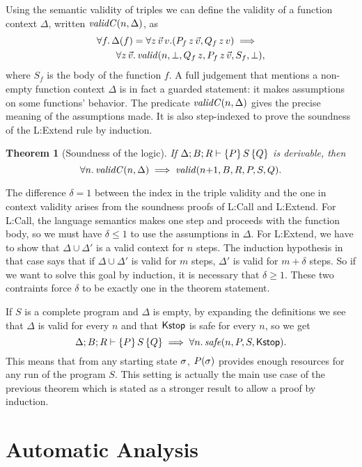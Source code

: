 \documentclass[nocopyrightspace,preprint]{sigplanconf}
\newtheorem{theorem}{Theorem}
\begin{document}
Using the semantic validity of triples we can define the validity
of a function context $\Delta$, written $\mathit{validC}(n,\Delta)$, as
\begin{align*}
  &\forall f .\, \Delta(f) =
    \forall z \, \vec v \, v .(P_f \, z \, \vec v, Q_f \, z \, v)
    \implies \\
  &\qquad \forall z \, \vec v .\,
  \mathit{valid}(n,\bot,Q_f \, z,P_f \, z \, \vec v,S_f,\bot) ,
\end{align*}
where $S_f$ is the body of the function $f$.  A full
judgement that mentions a non-empty function context
$\Delta$ is in fact a guarded statement: it makes
assumptions on some functions' behavior.  The predicate
$\mathit{validC}(n,\Delta)$ gives the precise meaning of the
assumptions made.  It is also step-indexed to prove the
soundness of the {\sc L:Extend} rule by induction.
%
\begin{theorem}[Soundness of the logic]
  If $\Delta; B; R \vdash \{P\}\, S\, \{Q\}$ is derivable, then
  $$
    \forall n .\, \mathit{validC}(n,\Delta)
      \implies \mathit{valid}(n {+} 1,B,R,P,S,Q).
  $$
\end{theorem}
%
\noindent
The difference $\delta = 1$ between the index in the triple
validity and the one in context validity arises from
the soundness proofs of {\sc L:Call} and {\sc L:Extend}.  For
{\sc L:Call}, the language semantics makes one step and
proceeds with the function body, so we must have
$\delta \le 1$ to use the assumptions in $\Delta$.
For {\sc L:Extend}, we have to show that $\Delta \cup \Delta'$
is a valid context for $n$ steps.  The induction hypothesis
in that case says that if $\Delta \cup \Delta'$ is valid
for $m$ steps, $\Delta'$ is valid for $m+\delta$ steps.
So if we want to solve this goal by induction, it is
necessary that $\delta \ge 1$.  These two contraints force
$\delta$ to be exactly one in the theorem statement.

If $S$ is a complete program and $\Delta$ is empty, by
expanding the definitions we see that $\Delta$ is valid
for every $n$ and that $\mathsf{Kstop}$ is safe for every $n$, so
we get
$$
\Delta; B; R \vdash \{P\}\, S\, \{Q\} \implies   \forall n .\, \mathit{safe}(n,P,S,\mathsf{Kstop}).
$$
This means that from any starting state $\sigma$, $P(\sigma)$
provides enough resources for any run of the program $S$.  This
setting is actually the main use case of the previous theorem
which is stated as a stronger result to allow a proof by
induction.



\section{Automatic Analysis}
\end{document}

